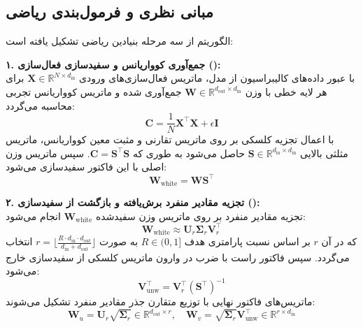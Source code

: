 \subsection{مبانی نظری و فرمول‌بندی ریاضی}
الگوریتم  از سه مرحله بنیادین ریاضی تشکیل یافته است:

\textbf{۱. جمع‌آوری کوواریانس و سفیدسازی فعال‌سازی ():} \\
با عبور داده‌های کالیبراسیون از مدل، ماتریس فعال‌سازی‌های ورودی $\mathbf{X} \in \mathbb{R}^{N \times d_{\text{in}}}$ برای هر لایه خطی با وزن $\mathbf{W} \in \mathbb{R}^{d_{\text{out}} \times d_{\text{in}}}$ جمع‌آوری شده و ماتریس کوواریانس تجربی محاسبه می‌گردد:
\begin{equation}
\mathbf{C} = \frac{1}{N} \mathbf{X}^\top \mathbf{X} + \epsilon \mathbf{I}
\end{equation}
با اعمال تجزیه کلسکی بر روی ماتریس تقارنی و مثبت معین کوواریانس، ماتریس مثلثی بالایی $\mathbf{S} \in \mathbb{R}^{d_{\text{in}} \times d_{\text{in}}}$ حاصل می‌شود به طوری که $\mathbf{C} = \mathbf{S}^\top \mathbf{S}$. سپس ماتریس وزن اصلی با این فاکتور سفیدسازی می‌شود:
\begin{equation}
\mathbf{W}_{\text{white}} = \mathbf{W} \mathbf{S}^\top
\end{equation}

\textbf{۲. تجزیه مقادیر منفرد برش‌یافته و بازگشت از سفیدسازی ():} \\
تجزیه مقادیر منفرد بر روی ماتریس وزن سفیدشده $\mathbf{W}_{\text{white}}$ انجام می‌شود:
\begin{equation}
\mathbf{W}_{\text{white}} \approx \mathbf{U}_r \mathbf{\Sigma}_r \mathbf{V}_r^\top
\end{equation}
که در آن $r$ بر اساس نسبت پارامتری هدف $R \in (0, 1]$ به صورت $r = \lfloor \frac{R \cdot d_{\text{in}} \cdot d_{\text{out}}}{d_{\text{in}} + d_{\text{out}}} \rfloor$ انتخاب می‌گردد. سپس فاکتور راست با ضرب در وارون ماتریس کلسکی از سفیدسازی خارج می‌شود:
\begin{equation}
\mathbf{V}_{\text{unw}}^\top = \mathbf{V}_r^\top (\mathbf{S}^\top)^{-1}
\end{equation}
ماتریس‌های فاکتور نهایی با توزیع متقارن جذر مقادیر منفرد تشکیل می‌شوند:
\begin{equation}
\mathbf{W}_u = \mathbf{U}_r \sqrt{\mathbf{\Sigma}_r} \in \mathbb{R}^{d_{\text{out}} \times r}, \quad \mathbf{W}_v = \sqrt{\mathbf{\Sigma}_r} \mathbf{V}_{\text{unw}}^\top \in \mathbb{R}^{r \times d_{\text{in}}}
\end{equation}

